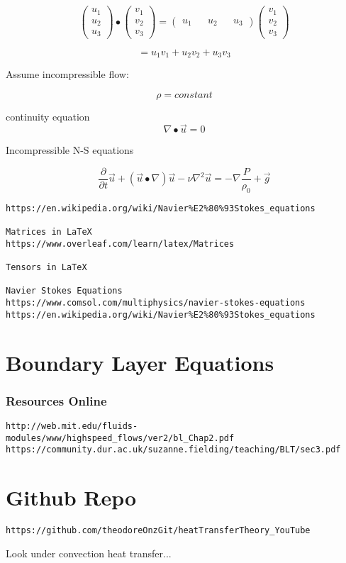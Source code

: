 \documentclass[11pt]{article}
\begin{document}
$$ \begin{pmatrix}
u_1 \\
u_2 \\
u_3 
\end{pmatrix} \bullet \begin{pmatrix}
v_1 \\
v_2 \\
v_3 
\end{pmatrix}
=
\begin{pmatrix}
u_1 && u_2 && u_3
\end{pmatrix} \begin{pmatrix}
v_1 \\
v_2 \\
v_3 
\end{pmatrix} $$

$$= u_1 v_1 + u_2 v_2 + u_3 v_3 $$

Assume incompressible flow:

$$\rho=constant$$

continuity equation
$$\nabla \bullet \vec{u}=0$$


Incompressible N-S equations

$$\frac{\partial }{\partial t}\vec{u} +(\vec{u}\bullet \nabla) \vec{u} - \nu \nabla^2 \vec{u} = - \nabla \frac{P}{\rho_0} +\vec{g}$$

\begin{verbatim}
https://en.wikipedia.org/wiki/Navier%E2%80%93Stokes_equations

Matrices in LaTeX
https://www.overleaf.com/learn/latex/Matrices

Tensors in LaTeX

Navier Stokes Equations
https://www.comsol.com/multiphysics/navier-stokes-equations
https://en.wikipedia.org/wiki/Navier%E2%80%93Stokes_equations
\end{verbatim}


\part{Boundary Layer Equations}


\section{Resources Online}


\begin{verbatim}
http://web.mit.edu/fluids-modules/www/highspeed_flows/ver2/bl_Chap2.pdf
https://community.dur.ac.uk/suzanne.fielding/teaching/BLT/sec3.pdf
\end{verbatim}

\part{Github Repo}
\begin{verbatim}
https://github.com/theodoreOnzGit/heatTransferTheory_YouTube
\end{verbatim}

Look under convection heat transfer...
\end{document}
